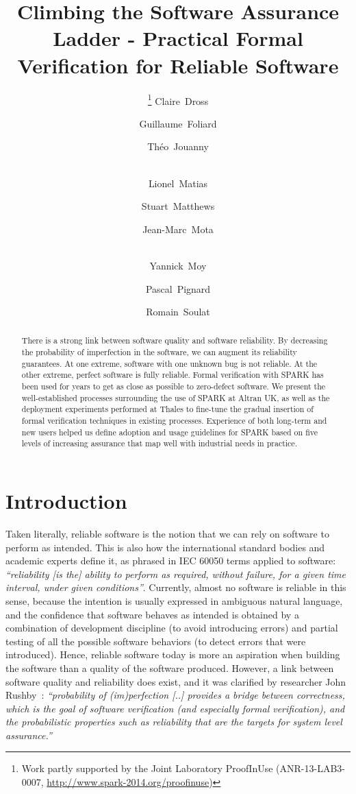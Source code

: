 \documentclass{llncs}
\title{Climbing the Software Assurance Ladder - Practical Formal Verification
  for Reliable Software}
\author{\thanks{Work partly supported by the Joint Laboratory
    ProofInUse (ANR-13-LAB3-0007, \url{http://www.spark-2014.org/proofinuse})} Claire~Dross\inst{1}
  \and Guillaume~Foliard\inst{2} \and
  Théo~Jouanny\inst{3} \and \\ Lionel~Matias\inst{2} \and
  Stuart~Matthews\inst{4} \and Jean-Marc~Mota\inst{5} \and \\
  Yannick~Moy\inst{1} \and Pascal~Pignard\inst{3} \and Romain~Soulat\inst{5}}
\institute{AdaCore, F-75009 Paris \and Thales Air Systems, F-91470 Limours \and
  Thales Communications \& Security, F-49300 Cholet \and Altran, Bath BA1 1AN,
  United Kingdom \and Thales Research \& Technologies, F-91767 Palaiseau}
\date{}
\begin{document}
\sloppy
{}
\maketitle

\begin{abstract}
There is a strong link between software quality and software reliability. By
decreasing the probability of imperfection in the software, we can augment its
reliability guarantees. At one extreme, software with one unknown bug is not
reliable. At the other extreme, perfect software is fully reliable. Formal
verification with SPARK has been used for years to get as close as possible to
zero-defect software. We present the well-established processes surrounding the
use of SPARK at Altran UK, as well as the deployment experiments performed at
Thales to fine-tune the gradual insertion of formal verification techniques in
existing processes.  Experience of both long-term and new users helped us
define adoption and usage guidelines for SPARK based on five levels of
increasing assurance that map well with industrial needs in practice.
\end{abstract}


\section{Introduction}

Taken literally, reliable software is the notion that we can rely on software
to perform as intended. This is also how the international standard bodies and
academic experts define it, as phrased in IEC 60050 terms applied to software:
\textit{``reliability [is the] ability to perform as required, without failure,
  for a given time interval, under given conditions''}. Currently, almost no
software is reliable in this sense, because the intention is usually expressed
in ambiguous natural language, and the confidence that software behaves as
intended is obtained by a combination of development discipline (to avoid
introducing errors) and partial testing of all the possible software behaviors
(to detect errors that were introduced). Hence, reliable software today is more
an aspiration when building the software than a quality of the software
produced.  However, a link between software quality and reliability does exist,
and it was clarified by researcher John Rushby~\cite{RushbySEFM2009}:
\textit{``probability of (im)perfection [..]  provides a bridge between
  correctness, which is the goal of software verification (and especially
  formal verification), and the probabilistic properties such as reliability
  that are the targets for system level assurance.''}
\end{document}
